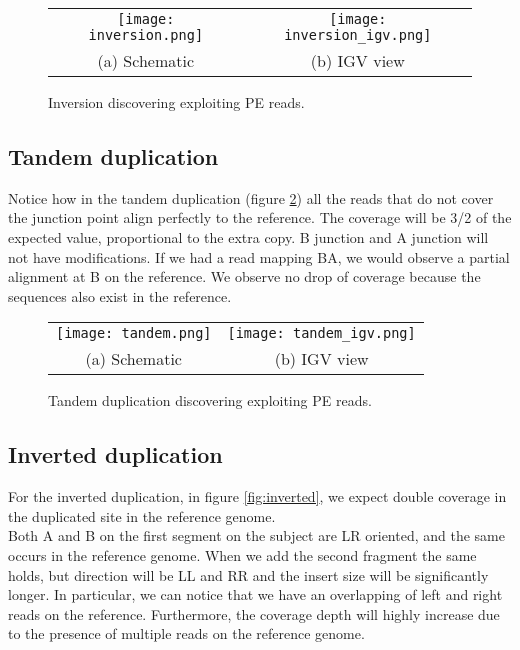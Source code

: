 
\begin{figure}[H]
\begin{tabular}{cc}
  \texttt{[image: inversion.png]} &   \texttt{[image: inversion\_igv.png]} \\
(a) Schematic & (b) IGV view \\[6pt]

\end{tabular}
\caption{Inversion discovering exploiting PE reads.}
\label{fig:inversion}
\end{figure}



\subsection{Tandem duplication}
Notice how in the tandem duplication (figure \ref{fig:tandem}) all the reads that do not cover the junction point align perfectly to the reference.
The coverage will be 3/2 of the expected value, proportional to the extra copy. B junction and A junction will not have modifications. If we had a read mapping BA, we would observe a partial alignment at B on the reference.
We observe no drop of coverage because the sequences also exist in the reference. \\


\begin{figure}[H]
\begin{tabular}{cc}
  \texttt{[image: tandem.png]} &   \texttt{[image: tandem\_igv.png]} \\
(a) Schematic & (b) IGV view \\[6pt]
\end{tabular}
\caption{Tandem duplication discovering exploiting PE reads.}
\label{fig:tandem}
\end{figure}

\subsection{Inverted duplication}
For the inverted duplication, in figure \ref{fig:inverted}, we expect double coverage in the duplicated site in the reference genome. \\
Both A and B on the first segment on the subject are LR oriented, and the same occurs in the reference genome.
When we add the second fragment the same holds, but direction will be LL and RR and the insert size will be significantly longer. In particular, we can notice that we have an overlapping of left and right reads on the reference. Furthermore, the coverage depth will highly increase due to the presence of multiple reads on the reference genome.

